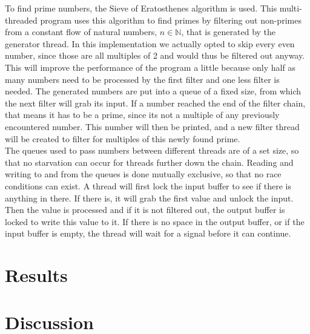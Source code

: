 \documentclass[a4paper,12px]{article}
\begin{document}
To find prime numbers, the Sieve of Eratosthenes algorithm is used. This
multi-threaded program uses this algorithm to find primes by filtering out
non-primes from a constant flow of natural numbers, $n \in \mathbb{N}$, that is
generated by the generator thread. In this implementation we actually opted to
skip every even number, since those are all multiples of 2 and would thus be
filtered out anyway. This will improve the performance of the program a little
because only half as many numbers need to be processed by the first filter and
one less filter is needed. The generated numbers are put into a queue of a fixed
size, from which the next filter will grab its input. If a number reached the
end of the filter chain, that means it has to be a prime, since its not a
multiple of any previously encountered number. This number will then be printed,
and a new filter thread will be created to filter for multiples of this newly
found prime.\\
The queues used to pass numbers between different threads are of a set size, so
that no starvation can occur for threads further down the chain. Reading and
writing to and from the queues is done mutually exclusive, so that no race
conditions can exist. A thread will first lock the input buffer to see if there
is anything in there. If there is, it will grab the first value and unlock the
input. Then the value is processed and if it is not filtered out, the output
buffer is locked to write this value to it. If there is no space in the output
buffer, or if the input buffer is empty, the thread will wait for a signal
before it can continue.

\section{Results}



\section{Discussion}




%
%
\end{document}
